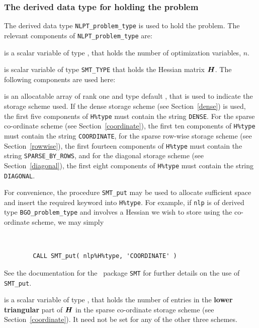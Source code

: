 \documentclass{galahad}
\newcommand{\packagename}{BGO}
\begin{document}

\subsubsection{The derived data type for holding the problem}\label{typeprob}
The derived data type {\tt NLPT\_problem\_type} is used to hold
the problem. The relevant components of
{\tt NLPT\_problem\_type}
are:

\begin{description}

 is a scalar variable of type \integer,
 that holds the number of optimization variables, $n$.

 is scalar variable of type {\tt SMT\_TYPE}
that holds the Hessian matrix ${\bm{H}}$. The following components
are used here:

\begin{description}

 is an allocatable array of rank one and type default
\character, that
is used to indicate the storage scheme used. If the dense storage scheme
(see Section~\ref{dense}) is used,
the first five components of {\tt H\%type} must contain the
string {\tt DENSE}.
For the sparse co-ordinate scheme (see Section~\ref{coordinate}),
the first ten components of {\tt H\%type} must contain the
string {\tt COORDINATE},
for the sparse row-wise storage scheme (see Section~\ref{rowwise}),
the first fourteen components of {\tt H\%type} must contain the
string {\tt SPARSE\_BY\_ROWS},
and for the diagonal storage scheme (see Section~\ref{diagonal}),
the first eight components of {\tt H\%type} must contain the
string {\tt DIAGONAL}.

For convenience, the procedure {\tt SMT\_put}
may be used to allocate sufficient space and insert the required keyword
into {\tt H\%type}.
For example, if {\tt nlp} is of derived type {\tt \packagename\_problem\_type}
and involves a Hessian we wish to store using the co-ordinate scheme,
we may simply
{\tt
\begin{verbatim}
        CALL SMT_put( nlp%H%type, 'COORDINATE' )
\end{verbatim}
}
\noindent
See the documentation for the \galahad\ package {\tt SMT}
for further details on the use of {\tt SMT\_put}.

 is a scalar variable of type \integer, that
holds the number of entries in the {\bf lower triangular} part of ${\bm{H}}$
in the sparse co-ordinate storage scheme (see Section~\ref{coordinate}).
It need not be set for any of the other three schemes.


\end{description}
\end{description}
\end{document}
